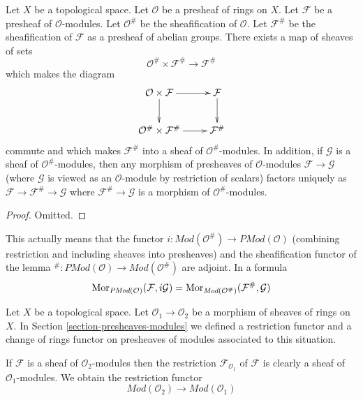 \begin{lemma}
\label{lemma-sheafification-presheaf-modules}
Let $X$ be a topological space.
Let $\mathcal{O}$ be a presheaf of rings on $X$.
Let $\mathcal{F}$ be a presheaf of $\mathcal{O}$-modules.
Let $\mathcal{O}^\#$ be the sheafification of $\mathcal{O}$.
Let $\mathcal{F}^\#$ be the sheafification of $\mathcal{F}$
as a presheaf of abelian groups. There exists a map of
sheaves of sets
$$
\mathcal{O}^\# \times \mathcal{F}^\#
\longrightarrow
\mathcal{F}^\#
$$
which makes the diagram
$$
\xymatrix{
\mathcal{O} \times \mathcal{F} \ar[r] \ar[d] &
\mathcal{F} \ar[d] \\
\mathcal{O}^\# \times \mathcal{F}^\# \ar[r] &
\mathcal{F}^\#
}
$$
commute and which makes $\mathcal{F}^\#$ into a sheaf
of $\mathcal{O}^\#$-modules. In addition, if $\mathcal{G}$
is a sheaf of $\mathcal{O}^\#$-modules, then any morphism
of presheaves of $\mathcal{O}$-modules $\mathcal{F} \to \mathcal{G}$
(where $\mathcal{G}$ is viewed as an $\mathcal{O}$-module by restriction of scalars)
factors uniquely as $\mathcal{F} \to \mathcal{F}^\# \to \mathcal{G}$
where $\mathcal{F}^\# \to \mathcal{G}$ is a morphism of
$\mathcal{O}^\#$-modules.
\end{lemma}

\begin{proof}
Omitted.
\end{proof}

\noindent
This actually means that the functor
$i : \textit{Mod}(\mathcal{O}^\#) \to \textit{PMod}(\mathcal{O})$
(combining restriction and including sheaves into presheaves)
and the sheafification functor of the lemma
${}^\# : \textit{PMod}(\mathcal{O}) \to \textit{Mod}(\mathcal{O}^\#)$
are adjoint. In a formula
$$
\mathop{\mathrm{Mor}}\nolimits_{\textit{PMod}(\mathcal{O})}(\mathcal{F}, i\mathcal{G})
=
\mathop{\mathrm{Mor}}\nolimits_{\textit{Mod}(\mathcal{O}^\#)}(\mathcal{F}^\#, \mathcal{G})
$$

\medskip\noindent
Let $X$ be a topological space.
Let $\mathcal{O}_1 \to \mathcal{O}_2$ be
a morphism of sheaves of rings on $X$.
In Section \ref{section-presheaves-modules}
we defined a restriction functor
and a change of rings functor on presheaves of modules
associated to this situation.

\medskip\noindent
If $\mathcal{F}$ is a sheaf of $\mathcal{O}_2$-modules
then the restriction $\mathcal{F}_{\mathcal{O}_1}$
of $\mathcal{F}$ is clearly a sheaf
of $\mathcal{O}_1$-modules. We obtain the restriction functor
$$
\textit{Mod}(\mathcal{O}_2)
\longrightarrow
\textit{Mod}(\mathcal{O}_1)
$$

